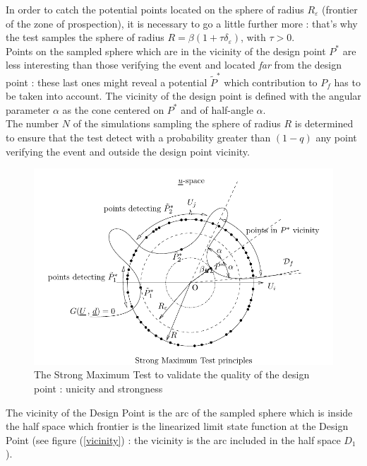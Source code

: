 In order to catch the potential points located on the sphere of radius $R_{\varepsilon}$ (frontier of the zone of prospection), it is necessary to go a little further more : that's why the test samples the sphere of radius  $R = \beta(1+\tau \delta_{\varepsilon})$, with $\tau >0$.\\

Points on the sampled sphere which are in the vicinity of the design point $P^*$ are less interesting than those verifying the event and located {\itshape far} from the design point : these last ones might reveal a potential $\tilde{P}^*$ which contribution to $P_f$ has to be taken into account. The  vicinity of the design point is defined with the angular parameter $\alpha$ as the cone centered on $P^*$ and of half-angle $\alpha$.\\

The number $N$ of the simulations sampling the sphere of radius $R$ is determined  to ensure that the test detect with a probability greater than $(1 - q)$ any point verifying the event and outside the design point vicinity. \\

\begin{figure}[H]
  \begin{center}
    \includegraphics[scale=0.85]{Figures/FigureStrongMaxTest.pdf}
    \caption{The Strong Maximum Test to validate the quality of the design point : unicity and strongness}
    \label{SMT}
  \end{center}
\end{figure}

The vicinity of the Design Point  is the arc of the sampled sphere which is inside the half space which frontier is the linearized limit state function at the Design Point (see figure (\ref{vicinity}) : the vicinity is the arc included in the half space $D_1$).\\

